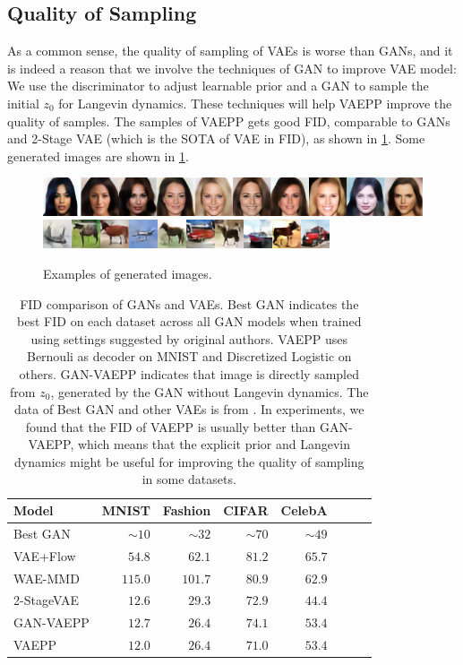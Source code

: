 \subsection{Quality of Sampling}
As a common sense, the quality of sampling of VAEs is worse than GANs, and it is indeed a reason that we involve the techniques of GAN to improve VAE model: We use the discriminator to adjust learnable prior and a GAN to sample the initial $z_0$ for Langevin dynamics. These techniques will help VAEPP improve the quality of samples. The samples of VAEPP gets good FID, comparable to GANs and 2-Stage VAE (which is the SOTA of VAE in FID), as shown in \cref{tab:compare_FID}. Some generated images are shown in \cref{fig:show_images}.
\begin{figure}[tb]
	\centering
	\includegraphics[width=1.0\columnwidth]{../figures/celeba}
	\includegraphics[width=1.0\columnwidth]{../figures/cifar}
	\caption{
		Examples of generated images.
	}
	\label{fig:show_images}
\end{figure}
\begin{table}[tb]
\centering
\begin{tabular}{lrrrrrrr}  
\toprule
Model & MNIST & Fashion & CIFAR & CelebA\\
\midrule
Best GAN   & $\sim10$& $\sim32$&$\sim70$& $\sim49$\\
VAE+Flow   & $54.8$  & $62.1$  & $81.2$ & $65.7$\\
WAE-MMD    & $115.0$ & $101.7$ & $80.9$ & $62.9$\\
2-StageVAE & $12.6$  & $29.3$  & $72.9$ & $44.4$\\
GAN-VAEPP  & $12.7$  & $26.4$  & $74.1$ & $53.4$ \\
VAEPP      & $12.0$  & $26.4$  & $71.0$ & $53.4$ \\
\bottomrule
\end{tabular} 
\caption{FID comparison of GANs and VAEs. Best GAN indicates the best FID on each dataset across all GAN models when trained using settings suggested by original authors. VAEPP uses Bernouli as decoder on MNIST and Discretized Logistic on others. GAN-VAEPP indicates that image is directly sampled from $z_0$, generated by the GAN without Langevin dynamics. The data of Best GAN and other VAEs is from \protect\cite{dai2019diagnosing}. In experiments, we found that the FID of VAEPP is usually better than GAN-VAEPP, which means that the explicit prior and Langevin dynamics might be useful for improving the quality of sampling in some datasets.
}\label{tab:compare_FID}
\end{table}

